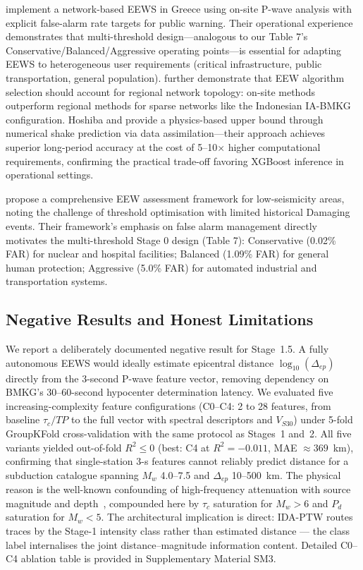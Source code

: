 \documentclass[10pt]{article}
\renewcommand{\cite}[1]{\citep{#1}}
\begin{document}
\citet{ref83} implement a network-based EEWS in Greece using on-site P-wave analysis with explicit false-alarm rate targets for public warning. Their operational experience demonstrates that multi-threshold design---analogous to our Table 7's Conservative/Balanced/Aggressive operating points---is essential for adapting EEWS to heterogeneous user requirements (critical infrastructure, public transportation, general population). \citet{ref82} further demonstrate that EEW algorithm selection should account for regional network topology: on-site methods outperform regional methods for sparse networks like the Indonesian IA-BMKG configuration. Hoshiba and \citet{ref84} provide a physics-based upper bound through numerical shake prediction via data assimilation---their approach achieves superior long-period accuracy at the cost of 5--10× higher computational requirements, confirming the practical trade-off favoring XGBoost inference in operational settings.

\citet{ref60} propose a comprehensive EEW assessment framework for low-seismicity areas, noting the challenge of threshold optimisation with limited historical Damaging events. Their framework's emphasis on false alarm management directly motivates the multi-threshold Stage 0 design (Table 7): Conservative (0.02\% FAR) for nuclear and hospital facilities; Balanced (1.09\% FAR) for general human protection; Aggressive (5.0\% FAR) for automated industrial and transportation systems.


\subsection{Negative Results and Honest Limitations}

We report a deliberately documented negative result for Stage~1.5. A fully autonomous EEWS would ideally estimate epicentral distance $\log_{10}(\Delta_{ep})$ directly from the 3-second P-wave feature vector, removing dependency on BMKG's 30--60-second hypocenter determination latency. We evaluated five increasing-complexity feature configurations (C0--C4: 2 to 28 features, from baseline $\tau_c/TP$ to the full vector with spectral descriptors and $V_{S30}$) under 5-fold GroupKFold cross-validation with the same protocol as Stages~1 and~2. All five variants yielded out-of-fold $R^2 \leq 0$ (best: C4 at $R^2 = -0.011$, MAE $\approx 369$~km), confirming that single-station 3-s features cannot reliably predict distance for a subduction catalogue spanning $M_w$ 4.0--7.5 and $\Delta_{ep}$ 10--500~km. The physical reason is the well-known confounding of high-frequency attenuation with source magnitude and depth~\cite{ref22}, compounded here by $\tau_c$ saturation for $M_w > 6$ and $P_d$ saturation for $M_w < 5$. The architectural implication is direct: IDA-PTW routes traces by the Stage-1 intensity class rather than estimated distance --- the class label internalises the joint distance--magnitude information content. Detailed C0--C4 ablation table is provided in Supplementary Material SM3.
\end{document}
